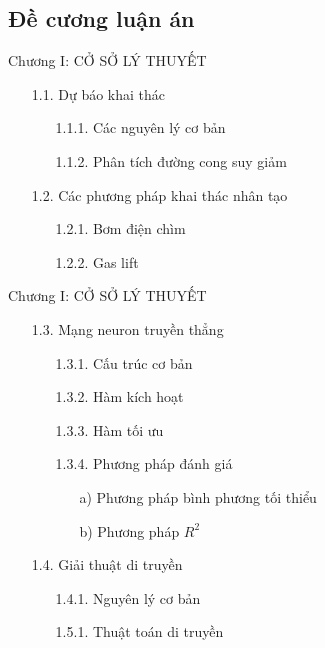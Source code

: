 \documentclass[xcolor=table, 11pt]{beamer}
\begin{document}
\subsection{Đề cương luận án}
\begin{frame}{Chương I: CỞ SỞ LÝ THUYẾT}
    \begin{itemize}
        \item[1.1.] Dự báo khai thác
            \begin{itemize}
                \item[1.1.1.] Các nguyên lý cơ bản
                \item[1.1.2.] Phân tích đường cong suy giảm
            \end{itemize}
        \item[1.2.] Các phương pháp khai thác nhân tạo
            \begin{itemize}
                \item[1.2.1.] Bơm điện chìm
                \item[1.2.2.] Gas lift
            \end{itemize}
    \end{itemize}
\end{frame}

\begin{frame}{Chương I: CỞ SỞ LÝ THUYẾT}
    \begin{itemize}
        \item[1.3.] Mạng neuron truyền thẳng
            \begin{itemize}
                \item[1.3.1.] Cấu trúc cơ bản
                \item[1.3.2.] Hàm kích hoạt
                \item[1.3.3.] Hàm tối ưu
                \item[1.3.4.] Phương pháp đánh giá
                    \begin{itemize}
                        \item[a)] Phương pháp bình phương tối thiểu
                        \item[b)] Phương pháp $R^2$
                    \end{itemize}
            \end{itemize}
        \item[1.4.] Giải thuật di truyền
            \begin{itemize}
                \item[1.4.1.] Nguyên lý cơ bản
                \item[1.5.1.] Thuật toán di truyền
            \end{itemize}
    \end{itemize}
\end{frame}
\end{document}
